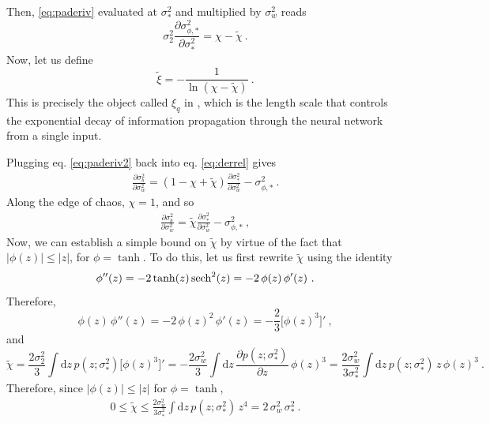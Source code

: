 %
Then, \eqref{eq:paderiv} evaluated at $\sigma_{*}^{2}$ and multiplied by $\sigma_{w}^{2}$ reads
%
\begin{equation} \label{eq:paderiv2}
	\sigma_{2}^{2} \frac{\partial \sigma_{\phi , *}^{2}}{\partial \sigma_{*}^{2}} = \chi - \tilde{\chi}~.
\end{equation}
%
Now, let us define
%
\begin{equation}
	\tilde{\xi} = - \frac{1}{\ln ( \chi - \tilde{\chi} )}~.
\end{equation}
%
This is precisely the object called $\xi_q$ in \cite{2016arXiv161101232S}, which is the length scale that controls the exponential decay of information propagation through the neural network from a single input.

Plugging eq. \eqref{eq:paderiv2} back into eq. \eqref{eq:derrel} gives
%
\begin{align}
	\frac{\partial \sigma_{b}^{2}}{\partial \sigma_{w}^{2}} = ( 1 - \chi + \tilde{\chi} ) \frac{\partial \sigma_{*}^{2}}{\partial \sigma_{w}^{2}} - \sigma_{\phi , *}^{2}~.
\end{align}
%
Along the edge of chaos, $\chi = 1$, and so
%
\begin{align} \label{eq:derrel1}
	\frac{\partial \sigma_{b}^{2}}{\partial \sigma_{w}^{2}} = \tilde{\chi} \frac{\partial \sigma_{*}^{2}}{\partial \sigma_{w}^{2}} - \sigma_{\phi , *}^{2}~,
\end{align}
%
Now, we can establish a simple bound on $\tilde{\chi}$ by virtue of the fact that $|\phi (z) | \leq |z|$, for $\phi = \tanh$. To do this, let us first rewrite $\tilde{\chi}$ using the identity
%
\begin{equation}
	\phi'' (z) = - 2 \tanh(z) \sech^2 (z) = -2 \, \phi (z) \, \phi'(z)~.
\end{equation}
%
Therefore,
%
\begin{equation}
	\phi (z) \, \phi'' (z) = - 2 \, \phi (z)^2 \, \phi' (z) = - \frac{2}{3} \bigl[ \phi (z)^3 \bigr]'~,
\end{equation}
%
and
%
\begin{equation}
	\tilde{\chi} = \frac{2 \sigma_{2}^{2}}{3} \int \mathrm{d} z \, p(z ; \sigma_{*}^{2} ) \bigl[ \phi (z)^3 \bigr]' = - \frac{2 \sigma_{w}^{2}}{3} \int \mathrm{d} z \, \frac{\partial p(z ; \sigma_{*}^{2} )}{\partial z} \, \phi (z)^3 = \frac{2 \sigma_{w}^{2}}{3 \sigma_{*}^{2}} \int \mathrm{d} z \, p (z ; \sigma_{*}^{2} ) \, z \, \phi (z)^3~.
\end{equation}
%
Therefore, since $|\phi (z) | \leq |z|$ for $\phi = \tanh$,
%
\begin{align}
	0 \leq \tilde{\chi} \leq \frac{2 \sigma_{w}^{2}}{3 \sigma_{*}^{2}} \int \mathrm{d} z \, p ( z; \sigma_{*}^{2} ) \, z^4 = 2 \, \sigma_{w}^{2} \, \sigma_{*}^{2}~.
\end{align}

